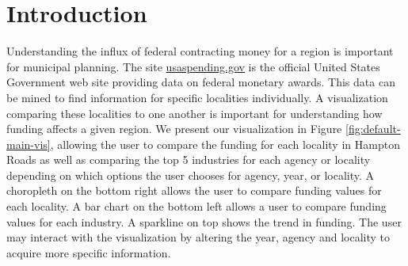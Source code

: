 \documentclass[10pt,journal,compsoc]{IEEEtran}
\begin{document}
%
\IEEEpeerreviewmaketitle

\ifCLASSOPTIONcompsoc
{}
\else
\section{Introduction}
\label{sec:introduction}
\fi

Understanding the influx of federal contracting money for a region is important for municipal planning.  The site \url{usaspending.gov} is the official United States Government web site providing data on federal monetary awards\cite{usaspending}.  This data can be mined to find information for specific localities individually.  A visualization comparing these localities to one another is important for understanding how funding affects a given region.  We present our visualization in Figure \ref{fig:default-main-vis}, allowing the user to compare the funding for each locality in Hampton Roads as well as comparing the top 5 industries for each agency or locality depending on which options the user chooses for agency, year, or locality.  A choropleth \cite{maceachren2004maps} on the bottom right allows the user to compare funding values for each locality.  A bar chart on the bottom left allows a user to compare funding values for each industry.  A sparkline \cite{tufte2001} on top shows the trend in funding.  The user may interact with the visualization by altering the year, agency and locality to acquire more specific information.
\end{document}
